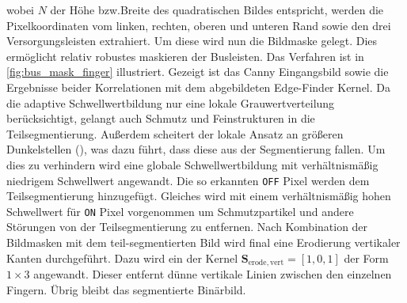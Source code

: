 wobei \(N\) der Höhe bzw.\@ Breite des quadratischen Bildes entspricht, werden die Pixelkoordinaten vom linken, rechten, oberen und unteren Rand sowie den drei Versorgungsleisten extrahiert. Um diese wird nun die Bildmaske gelegt. Dies ermöglicht relativ robustes maskieren der Busleisten. Das Verfahren ist in \cref{fig:bus_mask_finger} illustriert. Gezeigt ist das \foreignlanguage{english}{Canny} Eingangsbild sowie die Ergebnisse beider Korrelationen mit dem abgebildeten \foreignlanguage{english}{Edge-Finder} Kernel. Da die adaptive Schwellwertbildung nur eine lokale Grauwertverteilung berücksichtigt, gelangt auch Schmutz und Feinstrukturen in die Teilsegmentierung. Außerdem scheitert der lokale Ansatz an größeren Dunkelstellen (), was dazu führt, dass diese aus der Segmentierung fallen. Um dies zu verhindern wird eine globale Schwellwertbildung mit verhältnismäßig niedrigem Schwellwert angewandt. Die so erkannten \texttt{\foreignlanguage{english}{OFF}} Pixel werden dem Teilsegmentierung hinzugefügt. Gleiches wird mit einem verhältnismäßig hohen Schwellwert für \texttt{\foreignlanguage{english}{ON}} Pixel vorgenommen um Schmutzpartikel und andere Störungen von der Teilsegmentierung zu entfernen. Nach Kombination der Bildmasken mit dem teil-segmentierten Bild wird final eine Erodierung vertikaler Kanten durchgeführt. Dazu wird ein der Kernel \(\boldsymbol{S}_{\mathrm{erode},\mathrm{vert}} = {\left[ 1, 0, 1 \right]}\) der Form \(1 \times 3\) angewandt. Dieser entfernt dünne vertikale Linien zwischen den einzelnen Fingern. Übrig bleibt das segmentierte Binärbild.

